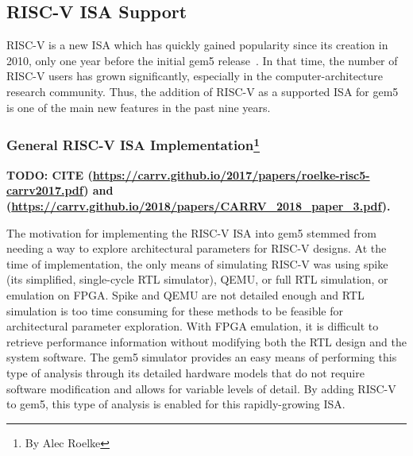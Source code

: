 \subsection[RISC-V ISA Support]{RISC-V ISA Support}

RISC-V is a new ISA which has quickly gained popularity since its creation in 2010, only one year before the initial gem5 release~\cite{Waterman2011riscv}.
In that time, the number of RISC-V users has grown significantly, especially in the computer-architecture research community.
Thus, the addition of RISC-V as a supported ISA for gem5 is one of the main new features in the past nine years.

\subsubsection[General RISC-V ISA Implementation]{General RISC-V ISA Implementation\footnote{By Alec Roelke}}

\textbf{TODO: CITE (\url{https://carrv.github.io/2017/papers/roelke-risc5-carrv2017.pdf}) and (\url{https://carrv.github.io/2018/papers/CARRV_2018_paper_3.pdf}).}

The motivation for implementing the RISC-V ISA into gem5 stemmed from needing a way to explore architectural parameters for RISC-V designs.
At the time of implementation, the only means of simulating RISC-V was using spike (its simplified, single-cycle RTL simulator), QEMU, or full RTL simulation, or emulation on FPGA.
Spike and QEMU are not detailed enough and RTL simulation is too time consuming for these methods to be feasible for architectural parameter exploration. With FPGA emulation, it is difficult to retrieve performance information without modifying both the RTL design and the system software.
The gem5 simulator provides an easy means of performing this type of analysis through its detailed hardware models that do not require software modification and allows for variable levels of detail.
By adding RISC-V to gem5, this type of analysis is enabled for this rapidly-growing ISA.

